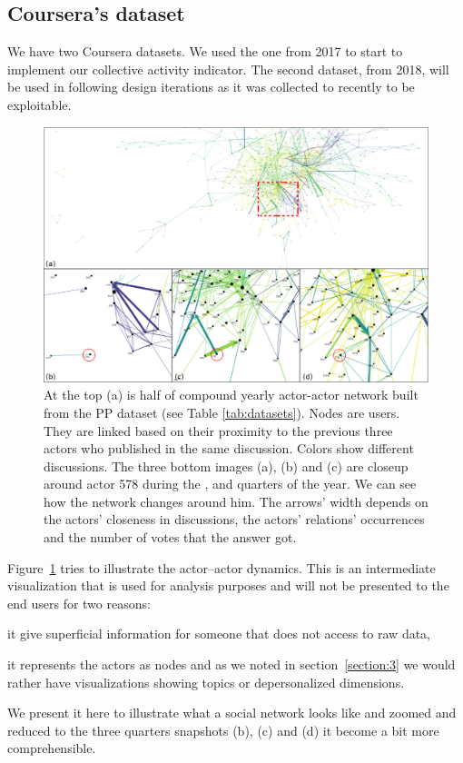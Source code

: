 \documentclass[a4paper,twoside]{article}
\begin{document}
\subsection{Coursera's dataset}
We have two Coursera datasets.  We used the one from 2017 to start to implement our collective activity indicator.  The second dataset, from 2018, will be used in following design iterations as it was collected to recently to be exploitable.

\begin{figure}[t]
  \centering
  \includegraphics[width=\textwidth]{images/evolution.png}
  \small{
    \caption{\label{fig:evolution}
      At the top (a) is half of compound yearly actor-actor network built from the PP dataset (see Table \ref{tab:datasets}).  Nodes are users.  They are linked based on their proximity to the previous three actors who published in the same discussion.  Colors show different discussions.  The three bottom images (a), (b) and (c) are closeup around actor 578 during the ,  and  quarters of the year.  We can see how the network changes around him.  The arrows' width depends on the actors' closeness in discussions, the actors' relations' occurrences and the number of votes that the answer got.
    }}
\end{figure}

Figure~\ref{fig:evolution} tries to illustrate the actor--actor dynamics.  This is an intermediate visualization that is used for analysis purposes and will not be presented to the end users for two reasons:
\begin{inparaenum}
\item it give superficial information for someone that does not access to raw data,
\item it represents the actors as nodes and as we noted in section~\ref{section:3} we would rather have visualizations showing topics or depersonalized dimensions.
\end{inparaenum}
We present it here to illustrate what a social network looks like and zoomed and reduced to the three quarters snapshots (b), (c) and (d) it become a bit more comprehensible.
\end{document}
